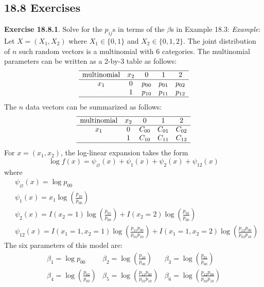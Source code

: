\subsection*{18.8 Exercises}

\textbf{Exercise 18.8.1}. Solve for the \(p_{ij}\)s in terms of the \(\beta\)s in Example 18.3:
\emph{Example}: Let \(X = (X_{1}, X_{2})\) where \(X_{1} \in \{0, 1\}\) and \(X_{2} \in \{ 0, 1, 2 \}\). The joint distribution of \(n\) such random vectors is a multinomial with 6 categories. The multinomial parameters can be written as a 2-by-3 table as follows:
\[
\begin{array}{ccccc}
\hline
\text{multinomial} & x_{2} & 0 & 1 & 2 \\
\hline
x_{1} & 0 & p_{00} & p_{01} & p_{02} \\
    & 1 & p_{10} & p_{11} & p_{12} \\
\hline
\end{array}
\]
The \(n\) data vectors can be summarized as follows:
\[
\begin{array}{ccccc}
\hline
\text{multinomial} & x_{2} & 0 & 1 & 2 \\
\hline
x_{1} & 0 & C_{00} & C_{01} & C_{02} \\
    & 1 & C_{10} & C_{11} & C_{12} \\
\hline
\end{array}
\]
For \(x = (x_{1}, x_{2})\), the log-linear expansion takes the form
\[
\log f(x) = \psi_\varnothing(x) + \psi_{1}(x) + \psi_{2}(x) + \psi_{12}(x)
\]
where
\begin{align*}
& \psi_\varnothing(x) = \log p_{00} \\
& \psi_{1}(x) = x_{1} \log \left( \frac{p_{10}}{p_{00}} \right) \\
& \psi_{2}(x) = I(x_{2} = 1) \log \left( \frac{p_{01}}{p_{00}} \right) 
            + I(x_{2} = 2) \log \left( \frac{p_{02}}{p_{00}} \right) \\
& \psi_{12}(x) = I(x_{1} = 1, x_{2} = 1) \log \left( \frac{p_{11}p_{00}}{p_{01}p_{10}} \right)
               + I(x_{1} = 1, x_{2} = 2) \log \left( \frac{p_{12}p_{00}}{p_{02}p_{10}} \right)
\end{align*}
The six parameters of this model are:
\[
\begin{array}{ccc}
\beta_{1} = \log p_{00} &
\beta_{2} = \log \left( \frac{p_{10}}{p_{00}} \right) &
\beta_{3} = \log \left( \frac{p_{01}}{p_{00}} \right) \\
\beta_{4} = \log \left( \frac{p_{02}}{p_{00}} \right) &
\beta_{5} = \log \left( \frac{p_{11}p_{00}}{p_{01}p_{10}} \right) &
\beta_{6} = \log \left( \frac{p_{12}p_{00}}{p_{02}p_{10}} \right)
\end{array}
\]

